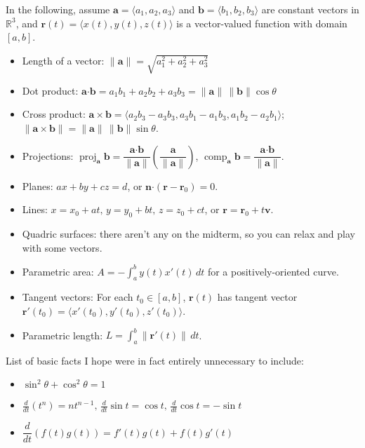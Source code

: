 \documentclass[12pt]{article}
\newcommand{\R}{\mathbb{R}}
\newcommand{\aaa}{\mathbf{a}}
\newcommand{\bbb}{\mathbf{b}}
\newcommand{\dotp}{\boldsymbol{\cdot}}
\begin{document}
In the following, assume $\aaa = \langle a_1,a_2,a_3\rangle$ and $\bbb = \langle b_1,b_2,b_3\rangle$ are constant vectors in $\R^3$, and $\mathbf{r}(t) = \langle x(t),y(t),z(t)\rangle$ is a vector-valued function with domain $[a,b]$.
\begin{itemize}
\item Length of a vector: $\lVert\aaa\rVert = \sqrt{a_1^2+a_2^2+a_3^2}$
\item Dot product: $\aaa\dotp\bbb = a_1b_1+a_2b_2+a_3b_3 = \lVert\aaa\rVert\,\lVert\bbb\rVert\cos\theta$
\item Cross product: $\aaa\times\bbb = \langle a_2b_3-a_3b_3,a_3b_1-a_1b_3,a_1b_2-a_2b_1\rangle$; $\lVert \aaa\times\bbb\rVert = \lVert\aaa\rVert\,\lVert\bbb\rVert\sin\theta$.
\item Projections: $\operatorname{proj}_\aaa\bbb = \dfrac{\aaa\dotp\bbb}{\lVert\aaa\rVert}\left(\dfrac{\aaa}{\lVert\aaa\rVert}\right)$, $\operatorname{comp}_\aaa\bbb = \dfrac{\aaa\dotp\bbb}{\lVert\aaa\rVert}$.
\item Planes: $ax+by+cz=d$, or $\mathbf{n}\dotp(\mathbf{r}-\mathbf{r}_0)=0$.
\item Lines: $x=x_0+at,\, y=y_0+bt,\, z=z_0+ct$, or $\mathbf{r} = \mathbf{r}_0+t\mathbf{v}$.
\item Quadric surfaces: there aren't any on the midterm, so you can relax and play with some vectors.
\item Parametric area: $\displaystyle A = -\int_a^b y(t)x'(t)\, dt$ for a positively-oriented curve.
\item Tangent vectors: For each $t_0\in [a,b]$, $\mathbf{r}(t)$ has tangent vector $\mathbf{r}'(t_0) = \langle x'(t_0),y'(t_0),z'(t_0)\rangle$.
\item Parametric length: $\displaystyle L = \int_a^b\lVert\mathbf{r}'(t)\rVert\,dt$.
\end{itemize}
\begin{center}
List of basic facts I hope were in fact entirely unnecessary to include:
\end{center}
\begin{itemize}
\item $\sin^2\theta+\cos^2\theta = 1$
\item $\displaystyle \frac{d}{dt}(t^n) = nt^{n-1},\, \frac{d}{dt}\sin t = \cos t,\, \frac{d}{dt}\cos t = -\sin t$
\item $\dfrac{d}{dt}(f(t)g(t)) = f'(t)g(t)+f(t)g'(t)$
\end{itemize}
\end{document}
